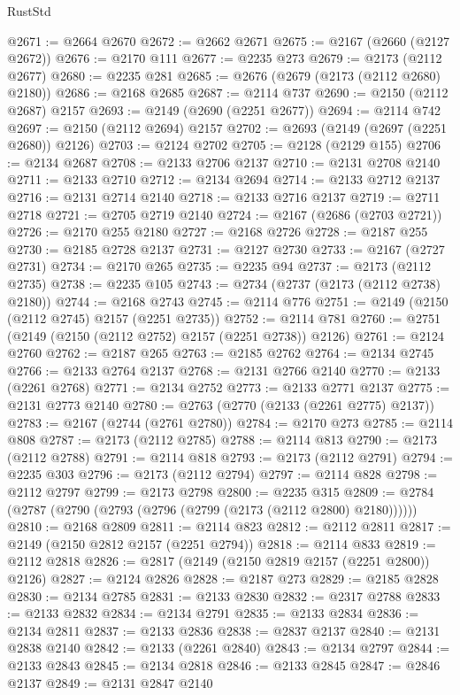 \begin{lexlean}{RustStd}
\begin{coremodule}
@2671 := @2664 @2670
@2672 := @2662 @2671
@2675 := @2167 (@2660 (@2127 @2672))
@2676 := @2170 @111
@2677 := @2235 @273
@2679 := @2173 (@2112 @2677)
@2680 := @2235 @281
@2685 := @2676 (@2679 (@2173 (@2112 @2680) @2180))
@2686 := @2168 @2685
@2687 := @2114 @737
@2690 := @2150 (@2112 @2687) @2157
@2693 := @2149 (@2690 (@2251 @2677))
@2694 := @2114 @742
@2697 := @2150 (@2112 @2694) @2157
@2702 := @2693 (@2149 (@2697 (@2251 @2680)) @2126)
@2703 := @2124 @2702
@2705 := @2128 (@2129 @155)
@2706 := @2134 @2687
@2708 := @2133 @2706 @2137
@2710 := @2131 @2708 @2140
@2711 := @2133 @2710
@2712 := @2134 @2694
@2714 := @2133 @2712 @2137
@2716 := @2131 @2714 @2140
@2718 := @2133 @2716 @2137
@2719 := @2711 @2718
@2721 := @2705 @2719 @2140
@2724 := @2167 (@2686 (@2703 @2721))
@2726 := @2170 @255 @2180
@2727 := @2168 @2726
@2728 := @2187 @255
@2730 := @2185 @2728 @2137
@2731 := @2127 @2730
@2733 := @2167 (@2727 @2731)
@2734 := @2170 @265
@2735 := @2235 @94
@2737 := @2173 (@2112 @2735)
@2738 := @2235 @105
@2743 := @2734 (@2737 (@2173 (@2112 @2738) @2180))
@2744 := @2168 @2743
@2745 := @2114 @776
@2751 := @2149 (@2150 (@2112 @2745) @2157 (@2251 @2735))
@2752 := @2114 @781
@2760 := @2751 (@2149 (@2150 (@2112 @2752) @2157 (@2251 @2738)) @2126)
@2761 := @2124 @2760
@2762 := @2187 @265
@2763 := @2185 @2762
@2764 := @2134 @2745
@2766 := @2133 @2764 @2137
@2768 := @2131 @2766 @2140
@2770 := @2133 (@2261 @2768)
@2771 := @2134 @2752
@2773 := @2133 @2771 @2137
@2775 := @2131 @2773 @2140
@2780 := @2763 (@2770 (@2133 (@2261 @2775) @2137))
@2783 := @2167 (@2744 (@2761 @2780))
@2784 := @2170 @273
@2785 := @2114 @808
@2787 := @2173 (@2112 @2785)
@2788 := @2114 @813
@2790 := @2173 (@2112 @2788)
@2791 := @2114 @818
@2793 := @2173 (@2112 @2791)
@2794 := @2235 @303
@2796 := @2173 (@2112 @2794)
@2797 := @2114 @828
@2798 := @2112 @2797
@2799 := @2173 @2798
@2800 := @2235 @315
@2809 := @2784 (@2787 (@2790 (@2793 (@2796 (@2799 (@2173 (@2112 @2800) @2180))))))
@2810 := @2168 @2809
@2811 := @2114 @823
@2812 := @2112 @2811
@2817 := @2149 (@2150 @2812 @2157 (@2251 @2794))
@2818 := @2114 @833
@2819 := @2112 @2818
@2826 := @2817 (@2149 (@2150 @2819 @2157 (@2251 @2800)) @2126)
@2827 := @2124 @2826
@2828 := @2187 @273
@2829 := @2185 @2828
@2830 := @2134 @2785
@2831 := @2133 @2830
@2832 := @2317 @2788
@2833 := @2133 @2832
@2834 := @2134 @2791
@2835 := @2133 @2834
@2836 := @2134 @2811
@2837 := @2133 @2836
@2838 := @2837 @2137
@2840 := @2131 @2838 @2140
@2842 := @2133 (@2261 @2840)
@2843 := @2134 @2797
@2844 := @2133 @2843
@2845 := @2134 @2818
@2846 := @2133 @2845
@2847 := @2846 @2137
@2849 := @2131 @2847 @2140

\end{coremodule}
\end{lexlean}

